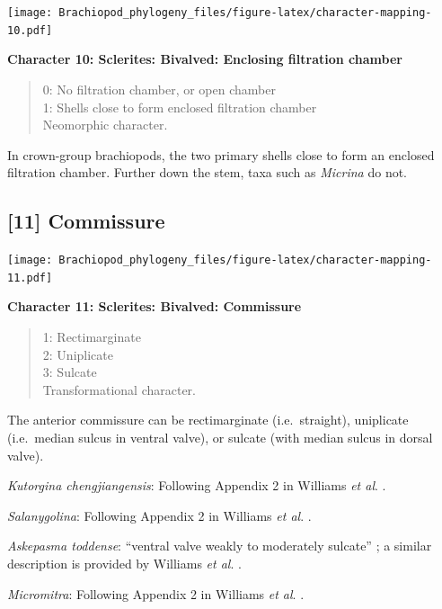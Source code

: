 \documentclass[]{book}
\theoremstyle{definition}
\theoremstyle{definition}
\theoremstyle{definition}
\theoremstyle{remark}
\begin{document}
\texttt{[image: Brachiopod\_phylogeny\_files/figure-latex/character-mapping-10.pdf]}

\textbf{Character 10: Sclerites: Bivalved: Enclosing filtration chamber}

\begin{quote}
0: No filtration chamber, or open chamber\\
1: Shells close to form enclosed filtration chamber\\
Neomorphic character.
\end{quote}

In crown-group brachiopods, the two primary shells close to form an
enclosed filtration chamber. Further down the stem, taxa such as
\emph{Micrina} do not.

\hypertarget{commissure}{%
\subsection*{{[}11{]} Commissure}\label{commissure}}

\texttt{[image: Brachiopod\_phylogeny\_files/figure-latex/character-mapping-11.pdf]}

\textbf{Character 11: Sclerites: Bivalved: Commissure}

\begin{quote}
1: Rectimarginate\\
2: Uniplicate\\
3: Sulcate\\
Transformational character.
\end{quote}

The anterior commissure can be rectimarginate (i.e.~straight),
uniplicate (i.e.~median sulcus in ventral valve), or sulcate (with
median sulcus in dorsal valve).

\emph{Kutorgina chengjiangensis}: Following Appendix 2 in Williams
\emph{et al}. \citeyearpar{Williams1998Thediversity}.

\emph{Salanygolina}: Following Appendix 2 in Williams \emph{et al}.
\citeyearpar{Williams1998Thediversity}.

\emph{Askepasma toddense}: ``ventral valve weakly to moderately
sulcate'' \citep{Topper2013Theoldest}; a similar description is provided
by Williams \emph{et al}.
\citeyearpar{Williams2000BrachiopodaLinguliformea}.

\emph{Micromitra}: Following Appendix 2 in Williams \emph{et al}.
\citeyearpar{Williams1998Thediversity}.
\end{document}
